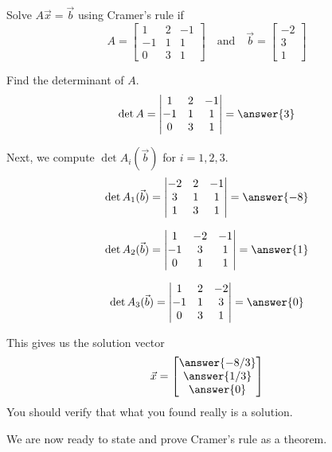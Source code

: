 \documentclass{ximera}
\begin{document}
\begin{example}\label{ex:cramer3by3}
Solve $A\vec{x}=\vec{b}$ using Cramer's rule if
$$A=\begin{bmatrix}1&2&-1\\-1&1&1\\0&3&1\end{bmatrix}\quad\text{and}\quad \vec{b}=\begin{bmatrix}-2\\3\\1\end{bmatrix}$$
 
\begin{explanation}
Find the determinant of $A$.
$$\det{A}=\begin{vmatrix}1&2&-1\\-1&1&1\\0&3&1\end{vmatrix}=\answer{3}$$
 
Next, we compute $\det{A_i(\vec{b})}$ for $i=1, 2, 3$.
$$\det{A_1(\vec{b})}=\begin{vmatrix}-2&2&-1\\3&1&1\\1&3&1\end{vmatrix}=\answer{-8}$$
 
$$\det{A_2(\vec{b})}=\begin{vmatrix}1&-2&-1\\-1&3&1\\0&1&1\end{vmatrix}=\answer{1}$$
 
$$\det{A_3(\vec{b})}=\begin{vmatrix}1&2&-2\\-1&1&3\\0&3&1\end{vmatrix}=\answer{0}$$
 
This gives us the solution vector
$$\vec{x}=\begin{bmatrix}\answer{-8/3}\\\answer{1/3}\\\answer{0}\end{bmatrix}$$
You should verify that what you found really is a solution.
\end{explanation}
\end{example}
We are now ready to state and prove Cramer's rule as a theorem.
 
\end{document}
